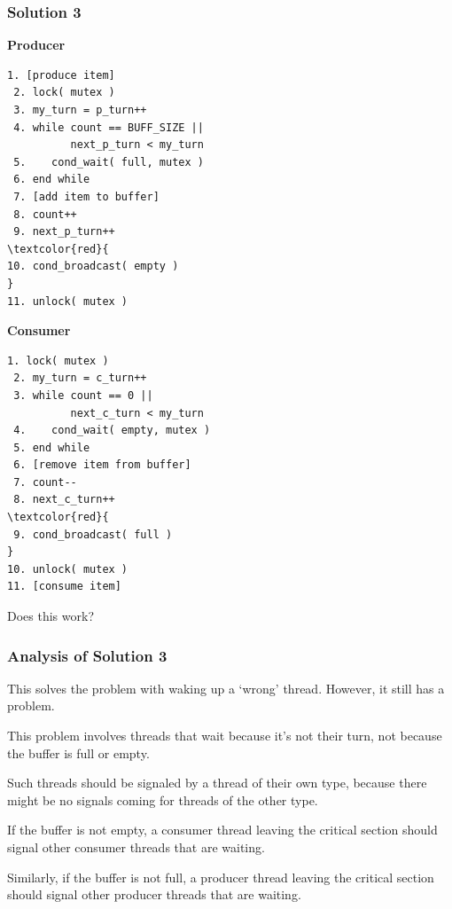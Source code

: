 \begin{frame}[fragile]
	\frametitle{Solution 3}

	\begin{multicols}{2}
		\small
		\textbf{Producer}
		\begin{Verbatim}[commandchars=\\\{\}]
 1. [produce item]
 2. lock( mutex )
 3. my_turn = p_turn++
 4. while count == BUFF_SIZE ||
          next_p_turn < my_turn
 5.    cond_wait( full, mutex )
 6. end while
 7. [add item to buffer]
 8. count++
 9. next_p_turn++
\textcolor{red}{
10. cond_broadcast( empty )
}
11. unlock( mutex )
		\end{Verbatim}
		\columnbreak
		\textbf{Consumer}\vspace{-2em}
		\begin{Verbatim}[commandchars=\\\{\}]
 1. lock( mutex )
 2. my_turn = c_turn++
 3. while count == 0 ||
          next_c_turn < my_turn
 4.    cond_wait( empty, mutex )
 5. end while
 6. [remove item from buffer]
 7. count--
 8. next_c_turn++
\textcolor{red}{
 9. cond_broadcast( full )
}
10. unlock( mutex )
11. [consume item]
		\end{Verbatim}
	\end{multicols}
	\vspace{-2em}

	Does this work?

\end{frame}


\begin{frame}
	\frametitle{Analysis of Solution 3}
	This solves the problem with waking up a `wrong' thread.
	However, it still has a problem.

	This problem involves threads that wait because it's not their turn, not because the buffer is full or empty.

	Such threads should be signaled by a thread of their own type, because there might be no signals coming for threads of the other type.

	If the buffer is not empty, a consumer thread leaving the critical section should signal other consumer threads that are waiting.

	Similarly, if the buffer is not full, a producer thread leaving the critical section should signal other producer threads that are waiting.
\end{frame}


